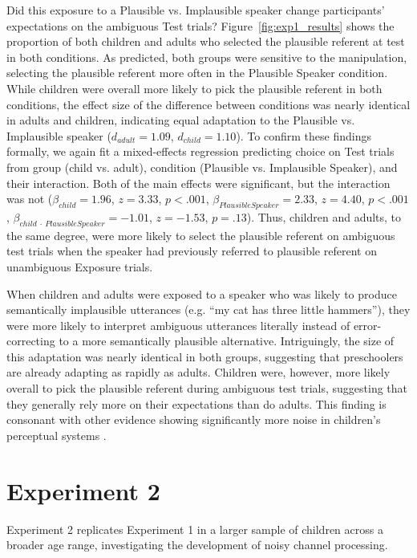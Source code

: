 \documentclass[man,floatsintext]{apa6}
\begin{document}
Did this exposure to a Plausible vs. Implausible speaker change participants' expectations on the ambiguous Test trials? Figure~\ref{fig:exp1_results} shows the proportion of both children and adults who selected the plausible referent at test in both conditions. As predicted, both groups were sensitive to the manipulation, selecting the plausible referent more often in the Plausible Speaker condition. While children were overall more likely to pick the plausible referent in both conditions, the effect size of the difference between conditions was nearly identical in adults and children, indicating equal adaptation to the Plausible vs. Implausible speaker ($d_{adult} =1.09$, $d_{child} = 1.10$). To confirm these findings formally, we again fit a mixed-effects regression predicting choice on Test trials from group (child vs. adult), condition (Plausible vs. Implausible Speaker), and their interaction. Both of the main effects were significant, but the interaction was not ($\beta_{child} = 1.96$,  $z = 3.33$, $p <.001$, $\beta_{Plausible Speaker} = 2.33$,  $z = 4.40$, $p <.001$,  $\beta_{child \: \cdot \: Plausible Speaker} = -1.01$,  $z = -1.53$, $p = .13$). Thus, children and adults, to the same degree, were more likely to select the plausible referent on ambiguous test trials when the speaker had previously referred to plausible referent on unambiguous Exposure trials.

When children and adults were exposed to a speaker who was likely to produce semantically implausible utterances (e.g. ``my cat has three little hammers''), they were more likely to interpret ambiguous utterances literally instead of error-correcting to a more semantically plausible alternative. Intriguingly, the size of this adaptation was nearly identical in both groups, suggesting that preschoolers are already adapting as rapidly as adults. Children were, however, more likely overall to pick the plausible referent during ambiguous test trials, suggesting that they generally rely more on their expectations than do adults. This finding is consonant with other evidence showing significantly more noise in children's perceptual systems \cite{neuman1983}.

\section{Experiment 2}

Experiment 2 replicates Experiment 1 in a larger sample of children across a broader age range, investigating the development of noisy channel processing.
\end{document}
